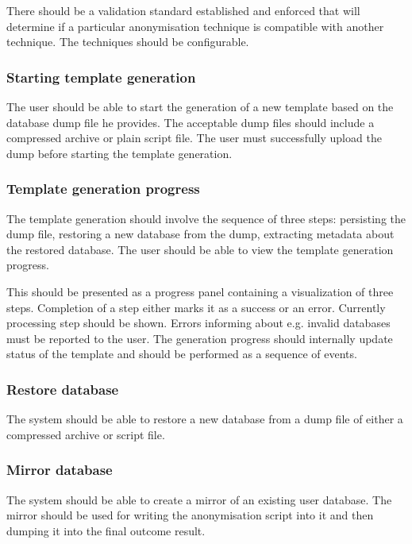 \documentclass[a4paper,twoside,12pt]{book}
\begin{document}
There should be a validation standard established and enforced that will determine if a particular anonymisation technique is compatible with another technique. The techniques should be configurable.

\subsubsection{Starting template generation}

The user should be able to start the generation of a new template based on the database dump file he provides. The acceptable dump files should include a compressed archive or plain script file. The user must successfully upload the dump before starting the template generation.

\subsubsection{Template generation progress}

The template generation should involve the sequence of three steps: persisting the dump file, restoring a new database from the dump, extracting metadata about the restored database. The user should be able to view the template generation progress.

This should be presented as a progress panel containing a visualization of three steps. Completion of a step either marks it as a success or an error. Currently processing step should be shown. Errors informing about e.g. invalid databases must be reported to the user. The generation progress should internally update status of the template and should be performed as a sequence of events.

\subsubsection{Restore database}

The system should be able to restore a new database from a dump file of either a compressed archive or script file.

\subsubsection{Mirror database}

The system should be able to create a mirror of an existing user database. The mirror should be used for writing the anonymisation script into it and then dumping it into the final outcome result.
\end{document}
